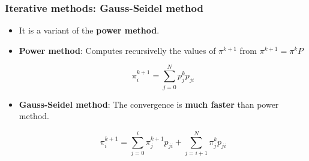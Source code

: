 \begin{frame}
    \frametitle{Iterative methods: Gauss-Seidel method}

 

        \begin{itemize}

            \item It is a variant of the \textbf{power method}. 

            \item \textbf{Power method}: Computes recursivelly the values of $\pi^{k+1}$ from $\pi^{k+1} = \pi^k P$

            $$\pi_{i}^{k+1} = \sum_{j=0}^{N} p_{j}^k p_{ji}$$


            \item \textbf{Gauss-Seidel method}: The convergence is \textbf{much faster} than power method.

            $$\pi_{i}^{k+1} = \sum_{j=0}^{i} \pi_{j}^{k+1} p_{ji} + \sum_{j=i+1}^N \pi_{j}^{k}p_{ji}$$ 


        \end{itemize}
\end{frame}

